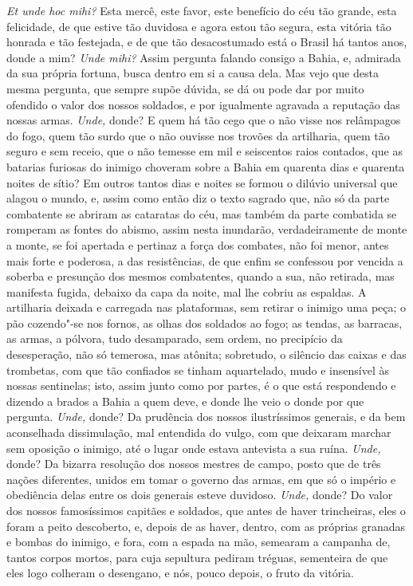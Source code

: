 \emph{Et unde hoc mihi?} Esta mercê, este favor, este benefício do céu
tão grande, esta felicidade, de que estive tão duvidosa e agora estou
tão segura, esta vitória tão honrada e tão festejada, e de que tão
desacostumado está o Brasil há tantos anos, donde a mim? \emph{Unde
mihi?} Assim pergunta falando consigo a Bahia, e, admirada da sua
própria fortuna, busca dentro em si a causa dela. Mas vejo que desta
mesma pergunta, que sempre supõe dúvida, se dá ou pode dar por muito
ofendido o valor dos nossos soldados, e por igualmente agravada a
reputação das nossas armas.
\emph{Unde,} donde? E quem há tão cego que o não visse nos relâmpagos do
fogo, quem tão surdo que o não ouvisse nos trovões da artilharia, quem
tão seguro e sem receio, que o não temesse em mil e seiscentos raios
contados, que as batarias furiosas do inimigo choveram sobre a Bahia em
quarenta dias e quarenta noites de sítio? Em outros tantos dias e noites
se formou o dilúvio universal que alagou o mundo, e, assim como então
diz o texto sagrado que, não só da parte combatente se abriram as
cataratas do céu, mas também da parte combatida se romperam as fontes do
abismo, assim nesta inundarão, verdadeiramente de monte a monte, se foi
apertada e pertinaz a força dos combates, não foi menor, antes mais
forte e poderosa, a das resistências, de que enfim se confessou por
vencida a soberba e presunção dos mesmos combatentes, quando a sua, não
retirada, mas manifesta fugida, debaixo da capa da noite, mal lhe cobriu
as espaldas.
A artilharia deixada e carregada nas plataformas, sem retirar o inimigo
uma peça; o pão cozendo"-se nos fornos, as olhas dos soldados ao fogo; as
tendas, as barracas, as armas, a pólvora, tudo desamparado, sem ordem,
no precipício da desesperação, não só temerosa, mas atônita; sobretudo,
o silêncio das caixas e das trombetas, com que tão confiados se tinham
aquartelado, mudo e insensível às nossas sentinelas; isto, assim junto
como por partes, é o que está respondendo e dizendo a brados a Bahia a
quem deve, e donde lhe veio o donde por que pergunta. \emph{Unde,}
donde? Da prudência dos nossos ilustríssimos generais, e da bem
aconselhada dissimulação, mal entendida do vulgo, com que deixaram
marchar sem oposição o inimigo, até o lugar onde estava antevista a sua
ruína. \emph{Unde,} donde? Da bizarra resolução dos nossos mestres de
campo, posto que de três nações diferentes, unidos em tomar o governo
das armas, em que só o império e obediência delas entre os dois generais
esteve duvidoso. \emph{Unde,} donde? Do valor dos nossos famosíssimos
capitães e soldados, que antes de haver trincheiras, eles o foram a
peito descoberto, e, depois de as haver,
dentro, com as próprias granadas e bombas do inimigo, e fora, com a
espada na mão, semearam a campanha de, tantos corpos mortos, para cuja
sepultura pediram tréguas, sementeira de que eles logo colheram o
desengano, e nós, pouco depois, o fruto da vitória.

